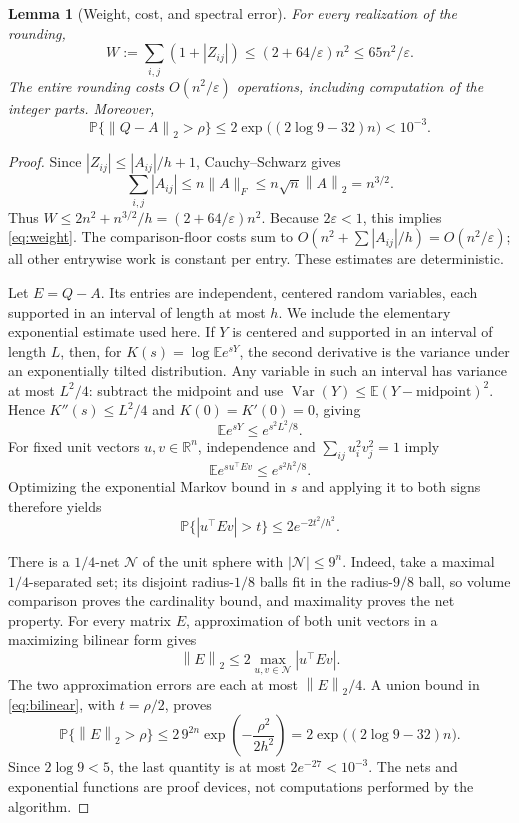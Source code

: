 \documentclass[11pt,a4paper]{article}
\newtheorem{lemma}[theorem]{Lemma}
\theoremstyle{remark}
\newcommand{\R}{\mathbb R}
\newcommand{\E}{\mathbb E}
\newcommand{\PP}{\mathbb P}
\newcommand{\eps}{\varepsilon}
\newcommand{\norm}[1]{\left\|#1\right\|_2}
\begin{document}
\begin{lemma}[Weight, cost, and spectral error]\label{lem:round}
For every realization of the rounding,
\begin{equation}\label{eq:weight}
 W:=\sum_{i,j}(1+|Z_{ij}|)
 \le (2+64/\eps)n^2\le65n^2/\eps.
\end{equation}
The entire rounding costs $O(n^2/\eps)$ operations, including computation of the
integer parts. Moreover,
\begin{equation}\label{eq:roundprob}
 \PP\{\norm{Q-A}>\rho\}
 \le 2\exp\bigl((2\log 9-32)n\bigr)<10^{-3}.
\end{equation}
\end{lemma}

\begin{proof}
Since $|Z_{ij}|\le |A_{ij}|/h+1$, Cauchy--Schwarz gives
\[
 \sum_{i,j}|A_{ij}|\le n\|A\|_F\le n\sqrt n\norm{A}=n^{3/2}.
\]
Thus $W\le2n^2+n^{3/2}/h=(2+64/\eps)n^2$. Because $2\eps<1$,
this implies \eqref{eq:weight}. The comparison-floor costs sum to
$O(n^2+\sum|A_{ij}|/h)=O(n^2/\eps)$; all other entrywise work is constant
per entry. These estimates are deterministic.

Let $E=Q-A$. Its entries are independent, centered random variables, each
supported in an interval of length at most $h$. We include the elementary
exponential estimate used here. If $Y$ is centered and supported in an interval
of length $L$, then, for $K(s)=\log\E e^{sY}$, the second derivative is the
variance under an exponentially tilted distribution. Any variable in such an
interval has variance at most $L^2/4$: subtract the midpoint and use
$\operatorname{Var}(Y)\le\E(Y-\mathrm{midpoint})^2$. Hence
$K''(s)\le L^2/4$ and $K(0)=K'(0)=0$, giving
\[
 \E e^{sY}\le e^{s^2L^2/8}.
\]
For fixed unit vectors $u,v\in\R^n$, independence and
$\sum_{ij}u_i^2v_j^2=1$ imply
\[
 \E e^{s u^\top Ev}\le e^{s^2h^2/8}.
\]
Optimizing the exponential Markov bound in $s$ and applying it to both signs
therefore yields
\begin{equation}\label{eq:bilinear}
 \PP\{|u^\top Ev|>t\}\le2e^{-2t^2/h^2}.
\end{equation}

There is a $1/4$-net $\mathcal N$ of the unit sphere with
$|\mathcal N|\le9^n$. Indeed, take a maximal $1/4$-separated set; its disjoint
radius-$1/8$ balls fit in the radius-$9/8$ ball, so volume comparison proves
the cardinality bound, and maximality proves the net property. For every
matrix $E$, approximation of both unit vectors in a maximizing bilinear form
gives
\[
 \norm{E}\le2\max_{u,v\in\mathcal N}|u^\top Ev|.
\]
The two approximation errors are each at most $\norm{E}/4$.
A union bound in \eqref{eq:bilinear}, with $t=\rho/2$, proves
\[
 \PP\{\norm{E}>\rho\}
 \le2\,9^{2n}\exp\!\left(-\frac{\rho^2}{2h^2}\right)
 =2\exp\bigl((2\log9-32)n\bigr).
\]
Since $2\log9<5$, the last quantity is at most $2e^{-27}<10^{-3}$.
The nets and exponential functions are proof devices, not computations
performed by the algorithm.
\end{proof}
\end{document}
